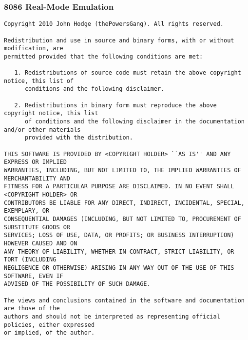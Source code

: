 \subsubsection{8086 Real-Mode Emulation}
\begin{verbatim}
Copyright 2010 John Hodge (thePowersGang). All rights reserved.

Redistribution and use in source and binary forms, with or without modification, are
permitted provided that the following conditions are met:

   1. Redistributions of source code must retain the above copyright notice, this list of
      conditions and the following disclaimer.

   2. Redistributions in binary form must reproduce the above copyright notice, this list
      of conditions and the following disclaimer in the documentation and/or other materials
      provided with the distribution.

THIS SOFTWARE IS PROVIDED BY <COPYRIGHT HOLDER> ``AS IS'' AND ANY EXPRESS OR IMPLIED
WARRANTIES, INCLUDING, BUT NOT LIMITED TO, THE IMPLIED WARRANTIES OF MERCHANTABILITY AND
FITNESS FOR A PARTICULAR PURPOSE ARE DISCLAIMED. IN NO EVENT SHALL <COPYRIGHT HOLDER> OR
CONTRIBUTORS BE LIABLE FOR ANY DIRECT, INDIRECT, INCIDENTAL, SPECIAL, EXEMPLARY, OR
CONSEQUENTIAL DAMAGES (INCLUDING, BUT NOT LIMITED TO, PROCUREMENT OF SUBSTITUTE GOODS OR
SERVICES; LOSS OF USE, DATA, OR PROFITS; OR BUSINESS INTERRUPTION) HOWEVER CAUSED AND ON
ANY THEORY OF LIABILITY, WHETHER IN CONTRACT, STRICT LIABILITY, OR TORT (INCLUDING
NEGLIGENCE OR OTHERWISE) ARISING IN ANY WAY OUT OF THE USE OF THIS SOFTWARE, EVEN IF
ADVISED OF THE POSSIBILITY OF SUCH DAMAGE.

The views and conclusions contained in the software and documentation are those of the
authors and should not be interpreted as representing official policies, either expressed
or implied, of the author.
\end{verbatim}

